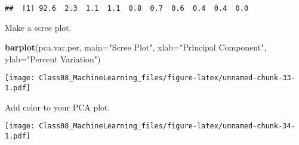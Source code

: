 \documentclass[]{article}
\newenvironment{Shaded}{\begin{snugshade}}{\end{snugshade}}
\newcommand{\DataTypeTok}[1]{\textcolor[rgb]{0.13,0.29,0.53}{#1}}
\newcommand{\DecValTok}[1]{\textcolor[rgb]{0.00,0.00,0.81}{#1}}
\newcommand{\KeywordTok}[1]{\textcolor[rgb]{0.13,0.29,0.53}{\textbf{#1}}}
\newcommand{\NormalTok}[1]{#1}
\newcommand{\OperatorTok}[1]{\textcolor[rgb]{0.81,0.36,0.00}{\textbf{#1}}}
\newcommand{\StringTok}[1]{\textcolor[rgb]{0.31,0.60,0.02}{#1}}
\begin{document}
\begin{verbatim}
##  [1] 92.6  2.3  1.1  1.1  0.8  0.7  0.6  0.4  0.4  0.0
\end{verbatim}

Make a scree plot.

\begin{Shaded}
\begin{Highlighting}[]
\KeywordTok{barplot}\NormalTok{(pca.var.per, }\DataTypeTok{main=}\StringTok{"Scree Plot"}\NormalTok{,}
 \DataTypeTok{xlab=}\StringTok{"Principal Component"}\NormalTok{, }\DataTypeTok{ylab=}\StringTok{"Percent Variation"}\NormalTok{)}
\end{Highlighting}
\end{Shaded}

\texttt{[image: Class08\_MachineLearning\_files/figure-latex/unnamed-chunk-33-1.pdf]}

Add color to your PCA plot.

\begin{Shaded}
\end{Shaded}

\texttt{[image: Class08\_MachineLearning\_files/figure-latex/unnamed-chunk-34-1.pdf]}
\end{document}
